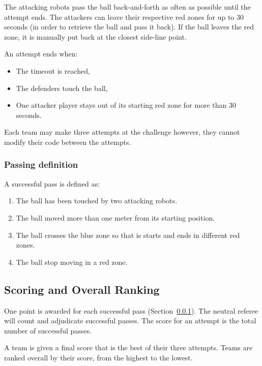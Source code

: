 The attacking robots pass the ball back-and-forth as often as possible until the attempt ends. The attackers can leave their respective red zones for up to 30 seconds (in order to retrieve the ball and pass it back). If the ball leaves the red zone, it is manually put back at the closest side-line point.
    
An attempt ends when: 
\begin{itemize}
    \item[1] The timeout is reached,
    \item[2] The defenders touch the ball,
    \item[3] One attacker player stays out of its starting red zone for more than 30 seconds.
\end{itemize}

Each team may make three attempts at the challenge however, they cannot modify their code between the attempts.

\subsubsection{Passing definition}
\label{sec:pass-definition}
A successful pass is defined as:
\begin{enumerate}
    \item The ball has been touched by two attacking robots.
    \item The ball moved more than one meter from its starting position.
    \item The ball crosses the blue zone so that is starts and ends in different red zones.
    \item The ball stop moving in a red zone.
\end{enumerate}

\subsection{Scoring and Overall Ranking}
One point is awarded for each successful pass (\cf Section~\ref{sec:pass-definition}). The neutral referee will count and adjudicate successful passes. The score for an attempt is the total number of successful passes.

A team is given a final score that is the best of their three attempts. Teams are ranked overall by their score, from the highest to the lowest. 

